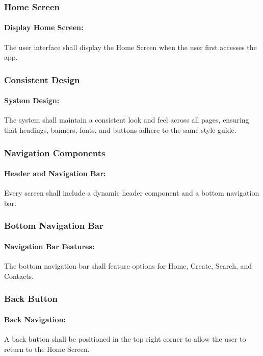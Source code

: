 \documentclass{article}
\begin{document}
\subsubsection*{Home Screen}
\addtocounter{subsubsection}{1}
\paragraph{Display Home Screen:} The user interface shall display the Home Screen when the user first accesses the app.
\subsubsection*{Consistent Design}
\addtocounter{subsubsection}{1}
\paragraph{System Design:} The system shall maintain a consistent look and feel across all pages, ensuring that headings, banners, fonts, and buttons adhere to the same style guide.
\subsubsection*{Navigation Components}
\addtocounter{subsubsection}{1}
\paragraph{Header and Navigation Bar:} Every screen shall include a dynamic header component and a bottom navigation bar.
\subsubsection*{Bottom Navigation Bar}
\addtocounter{subsubsection}{1}
\paragraph{Navigation Bar Features:} The bottom navigation bar shall feature options for Home, Create, Search, and Contacts.
\subsubsection*{Back Button}
\addtocounter{subsubsection}{1}
\paragraph{Back Navigation:} A back button shall be positioned in the top right corner to allow the user to return to the Home Screen.
\end{document}
